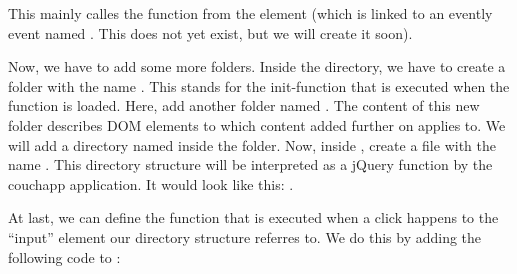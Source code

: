 \documentclass[letterpaper,10pt,english]{sphinxmanual}
\begin{document}
This mainly calles the function  from the element  (which is linked to an evently event named . This does not yet exist, but we will create it soon).

Now, we have to add some more folders. Inside the  directory, we have to create a folder with the name . This stands for the init-function that is executed when the function is loaded. Here, add another folder named . The content of this new folder describes DOM elements to which content added further on applies to. We will add a directory named  inside the  folder. Now, inside , create a file with the name .
This directory structure will be interpreted as a jQuery function by the couchapp application. It would look like this: .

At last, we can define the function that is executed when a click happens to the ``input'' element our directory structure referres to. We do this by adding the following code to :
\end{document}

